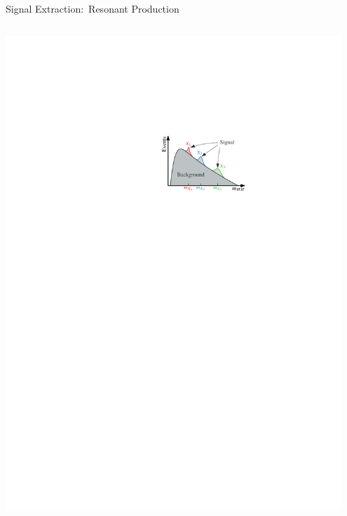 \documentclass[11pt, xcolor={dvipsnames}, aspectratio=169]{beamer}
\begin{document}
\begin{frame}{Signal Extraction:\ Resonant \allbold{\HH} Production}
\begin{columns}[onlytextwidth]
    \includegraphics[width=0.95\textwidth]{resonant_signal_extraction_illustration}
  \end{columns}
\end{frame}


\end{document}
